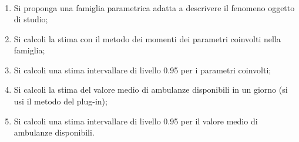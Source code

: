 \begin{enumerate}
\[\begin{array}{llllllll}
		      \end{array}
	      \]
	      \begin{enumerate}
		      \item Si proponga una famiglia parametrica adatta a descrivere il fenomeno oggetto di studio;
		      \item Si calcoli la stima con il metodo dei momenti dei parametri coinvolti nella famiglia;
		      \item Si calcoli una stima intervallare di livello 0.95 per i parametri coinvolti;
		      \item Si calcoli la stima del valore medio di ambulanze disponibili in un giorno (si usi il metodo del plug-in);
		      \item Si calcoli una stima intervallare di livello 0.95 per il valore medio di ambulanze disponibili.
	      \end{enumerate}
\end{enumerate}

